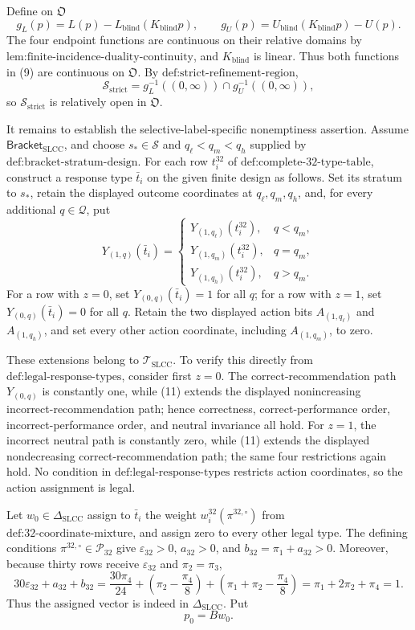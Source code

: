 Define on \(\mathfrak O\)
\[
 g_L(p)=L(p)-L_{\mathrm{blind}}(K_{\mathrm{blind}}p),
 \qquad
 g_U(p)=U_{\mathrm{blind}}(K_{\mathrm{blind}}p)-U(p).
\tag{9}
\]
The four endpoint functions are continuous on their relative domains by \(\text{lem:finite-incidence-duality-continuity}\), and \(K_{\mathrm{blind}}\) is linear.  Thus both functions in (9) are continuous on \(\mathfrak O\).  By \(\text{def:strict-refinement-region}\),
\[
 \mathcal S_{\mathrm{strict}}
 =g_L^{-1}((0,\infty))\cap g_U^{-1}((0,\infty)),
\tag{10}
\]
so \(\mathcal S_{\mathrm{strict}}\) is relatively open in \(\mathfrak O\).

It remains to establish the selective-label-specific nonemptiness assertion.  Assume \(\mathsf{Bracket}_{\mathrm{SLCC}}\), and choose \(s_*\in\mathcal S\) and \(q_\ell<q_m<q_h\) supplied by \(\text{def:bracket-stratum-design}\).  For each row \(t_i^{32}\) of \(\text{def:complete-32-type-table}\), construct a response type \(\bar t_i\) on the given finite design as follows.  Set its stratum to \(s_*\), retain the displayed outcome coordinates at \(q_\ell,q_m,q_h\), and, for every additional \(q\in\mathcal Q\), put
\[
 Y_{(1,q)}(\bar t_i)=
 \begin{cases}
 Y_{(1,q_\ell)}(t_i^{32}),&q<q_m,\\
 Y_{(1,q_m)}(t_i^{32}),&q=q_m,\\
 Y_{(1,q_h)}(t_i^{32}),&q>q_m.
 \end{cases}
\tag{11}
\]
For a row with \(z=0\), set \(Y_{(0,q)}(\bar t_i)=1\) for all \(q\); for a row with \(z=1\), set \(Y_{(0,q)}(\bar t_i)=0\) for all \(q\).  Retain the two displayed action bits \(A_{(1,q_\ell)}\) and \(A_{(1,q_h)}\), and set every other action coordinate, including \(A_{(1,q_m)}\), to zero.

These extensions belong to \(\mathcal T_{\mathrm{SLCC}}\).  To verify this directly from \(\text{def:legal-response-types}\), consider first \(z=0\).  The correct-recommendation path \(Y_{(0,q)}\) is constantly one, while (11) extends the displayed nonincreasing incorrect-recommendation path; hence correctness, correct-performance order, incorrect-performance order, and neutral invariance all hold.  For \(z=1\), the incorrect neutral path is constantly zero, while (11) extends the displayed nondecreasing correct-recommendation path; the same four restrictions again hold.  No condition in \(\text{def:legal-response-types}\) restricts action coordinates, so the action assignment is legal.

Let \(w_0\in\Delta_{\mathrm{SLCC}}\) assign to \(\bar t_i\) the weight \(w_i^{32}(\pi^{32,\circ})\) from \(\text{def:32-coordinate-mixture}\), and assign zero to every other legal type.  The defining conditions \(\pi^{32,\circ}\in\mathcal P_{32}\) give \(\varepsilon_{32}>0\), \(a_{32}>0\), and \(b_{32}=\pi_1+a_{32}>0\).  Moreover, because thirty rows receive \(\varepsilon_{32}\) and \(\pi_2=\pi_3\),
\[
 30\varepsilon_{32}+a_{32}+b_{32}
 =\frac{30\pi_4}{24}+\left(\pi_2-\frac{\pi_4}{8}\right)
  +\left(\pi_1+\pi_2-\frac{\pi_4}{8}\right)
 =\pi_1+2\pi_2+\pi_4=1.
\tag{12}
\]
Thus the assigned vector is indeed in \(\Delta_{\mathrm{SLCC}}\).  Put
\[
 p_0=Bw_0.
\tag{13}
\]

